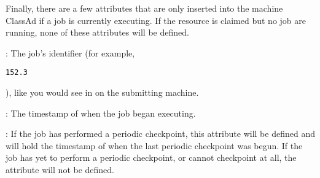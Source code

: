 Finally, there are a few attributes that are only inserted into the
machine ClassAd if a job is currently executing.  
If the resource is claimed but no job are running, none of these
attributes will be defined.

\begin{description}

\item[\AdAttr{JobId}] : The job's identifier (for example,
\begin{verbatim}152.3\end{verbatim}), like you would see in 
on the submitting machine.

\item[\AdAttr{JobStart}] : The timestamp of when the job began
executing. 

\item[\AdAttr{LastPeriodicCheckpoint}] : If the job has performed a
periodic checkpoint, this attribute will be defined and will hold the
timestamp of when the last periodic checkpoint was begun.
If the job has yet to perform a periodic checkpoint, or cannot
checkpoint at all, the  attribute will
not be defined.

\end{description}

